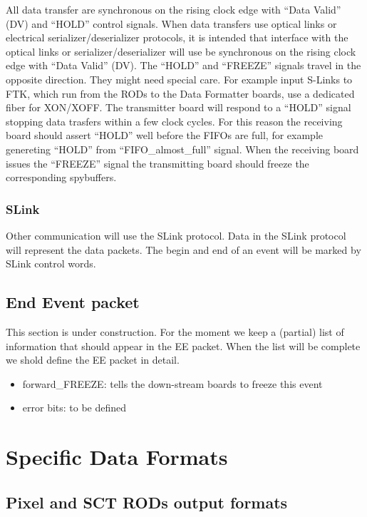 \documentclass[10pt]{article}
\numberwithin{figure}{section}
\numberwithin{equation}{section}
\numberwithin{table}{section}
\newcommand{\0}{\phantom{0}}
\begin{document}
All data transfer are synchronous on the rising clock edge with ``Data Valid'' (DV) and ``HOLD'' control signals.
When data transfers use optical links or electrical serializer/deserializer protocols, it is intended that interface with the optical links or serializer/deserializer will use be synchronous on the rising clock edge with ``Data Valid'' (DV). The ``HOLD'' and ``FREEZE'' signals travel in the opposite direction. They might need special care.
For example input S-Links to FTK, which run from the RODs to the Data Formatter boards, use a dedicated fiber for XON/XOFF.
The transmitter board will respond to a ``HOLD'' signal stopping data trasfers within a few clock cycles. 
For this reason the receiving board should assert ``HOLD'' well before the FIFOs are full, for example genereting ``HOLD'' from ``FIFO\_almost\_full'' signal.
When the receiving board issues the ``FREEZE'' signal the transmitting board should freeze the corresponding spybuffers.

\subsubsection{SLink}

Other communication will use the SLink protocol.
Data in the SLink protocol will represent the data packets.
The begin and end of an event will be marked by SLink control words.


\subsection{End Event packet}
This section is under construction. For the moment we keep a (partial) list of information that should appear in the EE packet. When the list will be complete we shold define the EE packet in detail.

\begin{itemize}
\item forward\_FREEZE: tells the down-stream boards to freeze this event
\item error bits: to be defined
\end{itemize}

\section{Specific Data Formats}
\subsection{Pixel and SCT RODs output formats}
\end{document}
